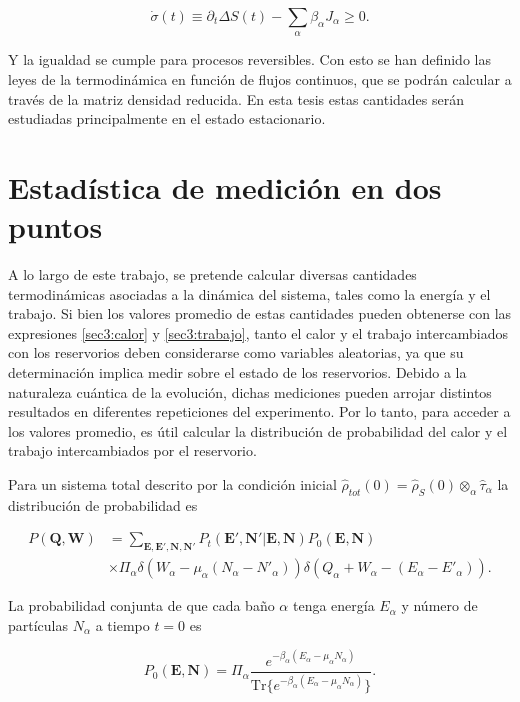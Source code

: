 \begin{equation*}
    \dot{\sigma}(t) \equiv \partial_{t}\Delta S(t) - \sum_{\alpha}\beta_{\alpha}J_{\alpha} \geq 0.
\end{equation*}

Y la igualdad se cumple para procesos reversibles. Con esto se han definido las leyes de la termodinámica en función de flujos continuos, que se podrán calcular a través de la matriz densidad reducida. En esta tesis estas cantidades serán estudiadas principalmente en el estado estacionario.

\label{sec3sub:leyestermo}

\section{Estadística de medición en dos puntos}
A lo largo de este trabajo, se pretende calcular diversas cantidades termodinámicas asociadas a la dinámica del sistema, tales como la energía y el trabajo. Si bien los valores promedio de estas cantidades pueden obtenerse con las expresiones \ref{sec3:calor} y \ref{sec3:trabajo}, tanto el calor y el trabajo intercambiados con los reservorios deben considerarse como variables aleatorias, ya que su determinación implica medir sobre el estado de los reservorios. Debido a la naturaleza cuántica de la evolución, dichas mediciones pueden arrojar distintos resultados en diferentes repeticiones del experimento. Por lo tanto, para acceder a los valores promedio, es útil calcular la distribución de probabilidad del calor y el trabajo intercambiados por el reservorio.

Para  un sistema total descrito por la condición inicial $\hat{\rho}_{tot}(0) = \hat{\rho}_{S}(0) \otimes_{\alpha} \hat{\tau}_{\alpha}$ la distribución de probabilidad es   

\begin{align*}
    P(\textbf{Q},\textbf{W}) & = \sum_{\textbf{E},\textbf{E}',\textbf{N},\textbf{N}'} P_{t}(\textbf{E}',\textbf{N}'|\textbf{E},\textbf{N}) P_{0}(\textbf{E},\textbf{N})\\
                             & \times \Pi_{\alpha} \delta(W_{\alpha} - \mu_{\alpha}(N_{\alpha} - N'_{\alpha})) \delta(Q_{\alpha} + W_{\alpha}  - (E_{\alpha} - E'_{\alpha})).   
\end{align*}

La probabilidad conjunta de que cada baño $\alpha$ tenga energía $E_{\alpha}$ y número de partículas $N_{\alpha}$ a tiempo $t=0$ es

\begin{equation*}
    P_{0}(\textbf{E},\textbf{N}) = \Pi_{\alpha}  \frac{e^{-\beta_{\alpha}(E_{\alpha} - \mu_{\alpha}N_{\alpha} )  }}{ \text{Tr}\{e^{-\beta_{\alpha}(E_{\alpha} - \mu_{\alpha}N_{\alpha} )  }\} }.
\end{equation*}

